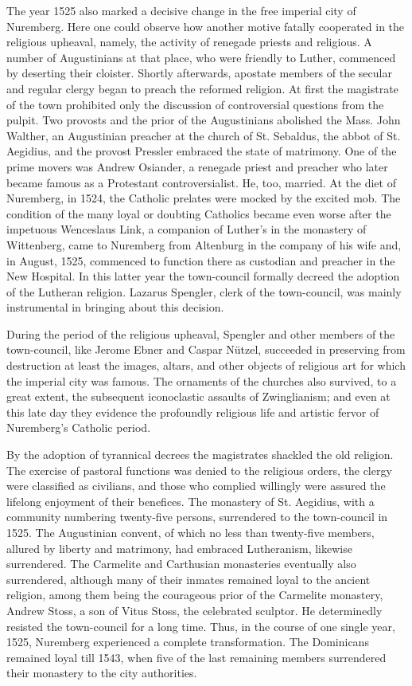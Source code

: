 The year 1525 also marked a decisive change in the free imperial
city of Nuremberg. Here one could observe how another motive fatally cooperated
in the religious upheaval, namely, the activity of
renegade priests and religious. A number of Augustinians at that
place, who were friendly to Luther, commenced by deserting their
cloister. Shortly afterwards, apostate members of the secular and
regular clergy began to preach the reformed religion. At first the
magistrate of the town prohibited only the discussion of controversial
questions from the pulpit. Two provosts and the prior of the
Augustinians abolished the Mass. John Walther, an Augustinian
preacher at the church of St. Sebaldus, the abbot of St. Aegidius, and
the provost Pressler embraced the state of matrimony. One of the
prime movers was Andrew Osiander, a renegade priest and preacher
who later became famous as a Protestant controversialist. He, too,
married. At the diet of Nuremberg, in 1524, the Catholic prelates
were mocked by the excited mob. The condition of the many loyal
or doubting Catholics became even worse after the impetuous Wenceslaus
Link, a companion of Luther’s in the monastery of Wittenberg,
came to Nuremberg from Altenburg in the company of his
wife and, in August, 1525, commenced to function there as custodian
and preacher in the New Hospital. In this latter year the town-council
formally decreed the adoption of the Lutheran religion. Lazarus
Spengler, clerk of the town-council, was mainly instrumental
in bringing about this decision.

During the period of the religious upheaval, Spengler and other
members of the town-council, like Jerome Ebner and Caspar Nützel,
succeeded in preserving from destruction at least the images, altars,
and other objects of religious art for which the imperial city
was famous. The ornaments of the churches also survived, to a great
extent, the subsequent iconoclastic assaults of Zwinglianism; and even
at this late day they evidence the profoundly religious life and artistic
fervor of Nuremberg’s Catholic period.

By the adoption of tyrannical decrees the magistrates shackled the
old religion. The exercise of pastoral functions was denied to the religious
orders, the clergy were classified as civilians, and those who
complied willingly were assured the lifelong enjoyment of their
benefices. The monastery of St. Aegidius, with a community numbering twenty-five
persons, surrendered to the town-council in 1525.
The Augustinian convent, of which no less than twenty-five members, allured
by liberty and matrimony, had embraced Lutheranism,
likewise surrendered. The Carmelite and Carthusian monasteries
eventually also surrendered, although many of their inmates remained
loyal to the ancient religion, among them being the courageous prior
of the Carmelite monastery, Andrew Stoss, a son of Vitus Stoss, the
celebrated sculptor. He determinedly resisted the town-council for
a long time. Thus, in the course of one single year, 1525, Nuremberg
experienced a complete transformation. The Dominicans remained
loyal till 1543, when five of the last remaining members surrendered
their monastery to the city authorities.

